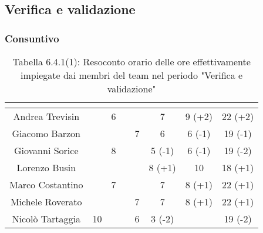 \subsection{Verifica e validazione}
\subsubsection{Consuntivo}
\renewcommand{\arraystretch}{1.5}
\begin{table}[H]
\begin{center}
\begin{tabular}{|c|c|c|c|c|c|c|c|}
\hline
\rowcolor{title_row}
\textbf{\color{title_text}{Nome}} & \textbf{\color{title_text}{Resp.}} & \textbf{\color{title_text}{Ammi.}} & \textbf{\color{title_text}{Analist.}} & \textbf{\color{title_text}{Progett.}} & \textbf{\color{title_text}{Program.}} & \textbf{\color{title_text}{Verific.}} & \textbf{\color{title_text}{Totale}} \\ \hline
Andrea Trevisin  & & 6 & & & 7 & 9 (+2) & 22 (+2)  \\ \hline
Giacomo Barzon   & & & & 7 & 6 & 6 (-1) & 19 (-1)  \\ \hline
Giovanni Sorice  & & 8 & &  & 5 (-1) & 6 (-1) & 19 (-2) \\ \hline
Lorenzo Busin    & & & & & 8 (+1) & 10 & 18 (+1) \\ \hline
Marco Costantino & & 7 & & & 7 & 8 (+1) & 22 (+1) \\ \hline
Michele Roverato & & & & 7 & 7 & 8 (+1) & 22 (+1) \\ \hline
Nicolò Tartaggia & 10 & & & 6 & 3 (-2) & & 19 (-2) \\ \hline
\end{tabular}
\caption{Tabella 6.4.1(1): Resoconto orario delle ore effettivamente impiegate dai membri del team nel periodo "Verifica e validazione"\label{}}
\end{center}
\end{table}
\renewcommand{\arraystretch}{1}

